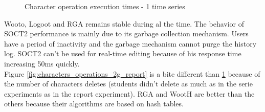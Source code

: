 \begin{figure}[h]
\begin{minipage}{.50\linewidth}
  \caption{Character operation execution times - 1 time
series}
  \label{fig:characters_operations_1t_big}
\end{minipage} \hfill
\end{figure}

Wooto, Logoot and RGA remains stable during al the time. The behavior of SOCT2 performance is mainly due to its garbage collection mechanism. Users have a period of inactivity and the garbage mechanism cannot purge the history log. SOCT2 can't be used for real-time editing because of his response time increasing 50ms quickly.\\

Figure \ref{fig:characters_operations_2g_report} is a bite different than \ref{fig:characters_operations_1t_big} because of the number of characters deletes (students didn't delete as much as in the serie experiments as in the report experiment). RGA and WootH are better than the others because their algorithms are based on hash tables.\\

